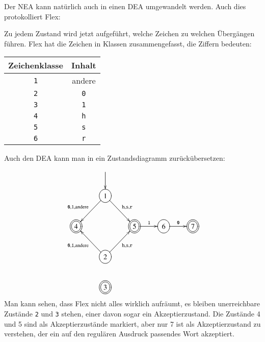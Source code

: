 Der NEA kann natürlich auch in einen DEA umgewandelt werden.
Auch dies protokolliert Flex: 

Zu jedem Zustand wird jetzt aufgeführt, welche Zeichen zu welchen
Übergängen führen.
Flex hat die Zeichen in Klassen zusammengefasst,
die Ziffern bedeuten:
\begin{center}
\begin{tabular}{|c|c|}
\hline
Zeichenklasse&Inhalt\\
\hline
{\tt 1}&andere\\
{\tt 2}&{\tt 0}\\
{\tt 3}&{\tt 1}\\
{\tt 4}&{\tt h}\\
{\tt 5}&{\tt s}\\
{\tt 6}&{\tt r}\\
\hline
\end{tabular}
\end{center}
Auch den DEA kann man in ein Zustandsdiagramm zurückübersetzen:
\[
\entrymodifiers={++[o][F]}
\xymatrix{
*+\txt{}
	&*+\txt{}\ar[d]
\\
*+\txt{}
	&{1}\ar[dr]^{{\tt h},{\tt s},{\tt r}} \ar[dl]_{{\tt 0}, {\tt 1}, \text{andere}}
\\
*++[o][F=]{4}
	&*+\txt{}
		&*++[o][F=]{5}\ar[r]^{\tt 1}
			&{6}\ar[r]^{\tt 0}
				&*++[o][F=]{7}
\\
*+\txt{}
	&{2}\ar[ur]_{{\tt h},{\tt s},{\tt r}} \ar[ul]^{{\tt 0}, {\tt 1}, \text{andere}}
\\
*+\txt{}
	&*++[o][F=]{3}
}
\]
Man kann sehen, dass Flex nicht alles wirklich aufräumt, es bleiben
unerreichbare Zustände {\tt 2} und {\tt 3} stehen, einer davon sogar ein
Akzeptierzustand.
Die Zustände 4 und 5 sind als
Akzeptierzustände markiert, aber nur 7 ist als Akzeptierzustand zu
verstehen, der ein auf den regulären Ausdruck passendes Wort
akzeptiert.

